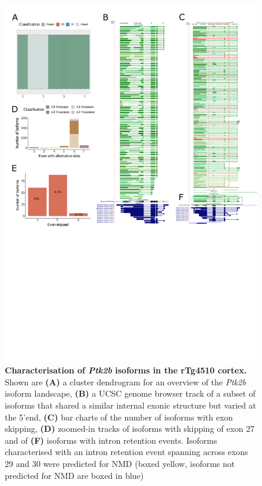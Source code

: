 \begin{figure}[htp]
	\centering
	\includegraphics[page=6,trim={0 2cm 0 0},scale = 0.85]{Figures/TargetGenes_Annotation_Portrait.pdf}
	\captionsetup{width=0.95\textwidth}
	\caption[Characterisation of the \textit{Ptk2b} isoform landscape]%
	{\textbf{Characterisation of \textit{Ptk2b} isoforms in the rTg4510 cortex.} Shown are \textbf{(A)} a cluster dendrogram for an overview of the \textit{Ptk2b} isoform landscape, \textbf{(B)} a UCSC genome browser track of a subset of isoforms that shared a similar internal exonic structure but varied at the 5'end, \textbf{(C)} bar charts of the number of isoforms with exon skipping, \textbf{(D)} zoomed-in tracks of isoforms with skipping of exon 27 and of \textbf{(F)} isoforms with intron retention events. Isoforms characterised with an intron retention event spanning across exons 29 and 30 were predicted for NMD (boxed yellow, isoforms not predicted for NMD are boxed in blue)}    
	\label{fig:ptk2b}
\end{figure}
\restoregeometry

